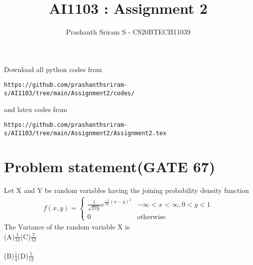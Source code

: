 \documentclass[journal,12pt,twocolumn]{IEEEtran}
\begin{document}
     \def\rightbox#1{\makebox[0in][r]{#1}}
     \def\centbox#1{\makebox[0in]{#1}}
     \def\topbox#1{\raisebox{-\baselineskip}[0in][0in]{#1}}
     \def\midbox#1{\raisebox{-0.5\baselineskip}[0in][0in]{#1}}
\vspace{3cm}
\title{AI1103 : Assignment 2}
\author{Prashanth Sriram S - CS20BTECH11039}
\maketitle
\newpage
\bigskip
\renewcommand{\thefigure}{\theenumi}
\renewcommand{\thetable}{\theenumi}
Download all python codes from 
\begin{lstlisting}
https://github.com/prashanthsriram-s/AI1103/tree/main/Assignment2/codes/
\end{lstlisting}
%
and latex codes from 
%
\begin{lstlisting}
https://github.com/prashanthsriram-s/AI1103/tree/main/Assignment2/Assignment2.tex
\end{lstlisting}
\section*{\textbf{Problem statement(GATE 67)}}
Let X and Y be random variables having the joining probability density function
\begin{align}
f(x,y)=
\begin{cases}
\frac{1}{\sqrt{2\pi y}}e^{\frac{-1}{2y}(x-y)^2} &-\infty<x<\infty,0<y<1\\
0 &\text{otherwise}
\end{cases}
\end{align}
The Variance of the random variable X is\\
(A)$\frac{1}{12}$\hspace{3cm}(C)$\frac{7}{12}$\\ \\
(B)$\frac{1}{4}$\hspace{3.18cm}(D)$\frac{5}{12}$
\end{document}
